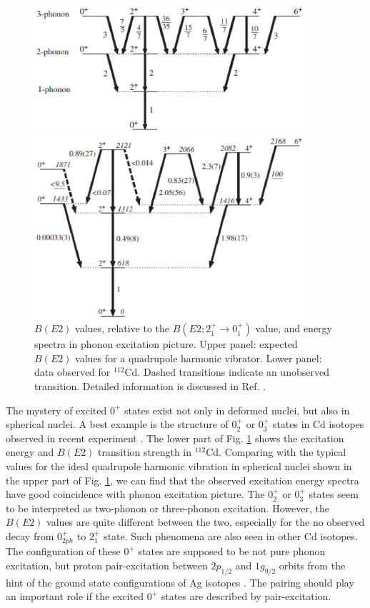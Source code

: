 \documentclass[11pt]{book} %
\begin{document}
\begin{figure}[tb]
 \begin{center}
    \includegraphics[width=100mm]{images/phonon.eps}
 \end{center}
 \begin{center}
    \includegraphics[width=100mm]{images/112Cd.eps}
 \end{center}
  \caption{$B(E2)$ values, relative to the $B(E2; 2_1^+\to 0_1^+)$ value, and energy spectra in phonon excitation picture. Upper panel: expected $B(E2)$ values for a quadrupole harmonic vibrator. Lower panel: data observed for ${}^{112}$Cd. Dashed transitions indicate an unobserved transition. Detailed information is discussed in Ref. \cite{GW10}.}
  \label{112Cd}
\end{figure}
The mystery of excited $0^+$ states exist not only in deformed nuclei, but also in spherical nuclei. A best example is the structure of $0_2^+$ or $0_3^+$ states in Cd isotopes observed in recent experiment \cite{GW10}. The lower part of Fig. \ref{112Cd} shows the excitation energy and $B(E2)$ transition strength in ${}^{112}$Cd. Comparing with the typical values for the ideal quadrupole harmonic vibration in spherical nuclei shown in the upper part of Fig. \ref{112Cd}, we can find that the observed excitation energy spectra have good coincidence with phonon excitation picture. The $0_2^+$ or $0_3^+$ states seem to be interpreted as two-phonon or three-phonon excitation. However, the $B(E2)$ values are quite different between the two, especially for the no observed decay from $0_{2ph}^+$ to $2_1^+$ state. Such phenomena are also seen in other Cd isotopes. The configuration of these $0^+$ states are supposed to be not pure phonon excitation, but proton pair-excitation between $2p_{1/2}$ and $1g_{9/2}$ orbits from the hint of the ground state configurations of Ag isotopes \cite{HW11}. The pairing should play an important role if the excited $0^+$ states are described by pair-excitation.
\end{document}

